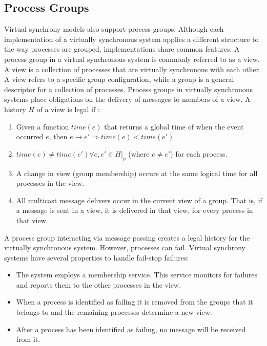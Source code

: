 \subsection{Process Groups}
Virtual synchrony models also support process groups. Although each implementation of a virtually synchronous system applies a different structure to the way processes are grouped, implementations share common features.
A process group in a virtual synchronous system is commonly referred to as a view. A view is a collection of processes that are virtually synchronous with each other. A view refers to a specific group configuration, while a group is a general descriptor for a collection of processes. Process groups in virtually synchronous systems place obligations on the delivery of messages to members of a view. A history $H$ of a view is legal if \cite[p~.103]{ISISTOOLKIT}:
\begin{enumerate}
    \item Given a function $time(e)$ that returns a global time of when the event occurred $e$, then $e \rightarrow e' \Rightarrow time(e) < time(e').$
    \item $time(e) \neq time(e') \forall e, e' \in H|_{p}$ (where $e \neq e'$) for each process.
    \item A change in view (group membership) occurs at the same logical time for all processes in the view.
    \item All multicast message delivers occur in the current view of a group. That is, if a message is sent in a view, it is delivered in that view, for every process in that view.
\end{enumerate}

A process group interacting via message passing creates a legal history for the virtually synchronous system. However, processes can fail.  Virtual synchrony systems have several properties to handle fail-stop failures\cite[p~.102]{ISISTOOLKIT}:

\begin{itemize}
    \item The system employs a membership service. This service monitors for failures and reports them to the other processes in the view.
    \item When a process is identified as failing it is removed from the groups that it belongs to and the remaining processes determine a new view.
    \item After a process has been identified as failing, no message will be received from it.
\end{itemize}

